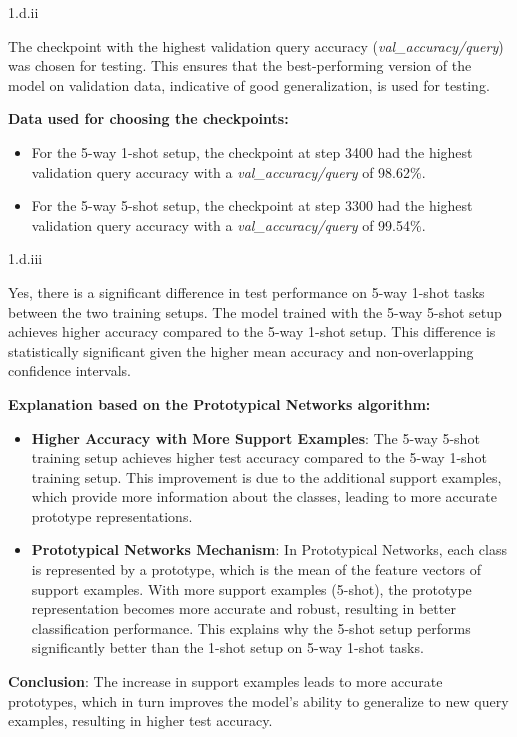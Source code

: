 \LARGE
1.d.ii
\normalsize

\begin{answer}
    The checkpoint with the highest validation query accuracy (\textit{val\_accuracy/query}) was chosen for testing. This ensures that the best-performing version of the model on validation data, indicative of good generalization, is used for testing.

\textbf{Data used for choosing the checkpoints:}

\begin{itemize}
    \item For the 5-way 1-shot setup, the checkpoint at step 3400 had the highest validation query accuracy with a \textit{val\_accuracy/query} of 98.62\%.
    \item For the 5-way 5-shot setup, the checkpoint at step 3300 had the highest validation query accuracy with a \textit{val\_accuracy/query} of 99.54\%.
\end{itemize}

\end{answer}

\LARGE
1.d.iii
\normalsize

\begin{answer}
    Yes, there is a significant difference in test performance on 5-way 1-shot tasks between the two training setups. The model trained with the 5-way 5-shot setup achieves higher accuracy compared to the 5-way 1-shot setup. This difference is statistically significant given the higher mean accuracy and non-overlapping confidence intervals.

\textbf{Explanation based on the Prototypical Networks algorithm:}

\begin{itemize}
    \item \textbf{Higher Accuracy with More Support Examples}: The 5-way 5-shot training setup achieves higher test accuracy compared to the 5-way 1-shot training setup. This improvement is due to the additional support examples, which provide more information about the classes, leading to more accurate prototype representations.
    \item \textbf{Prototypical Networks Mechanism}: In Prototypical Networks, each class is represented by a prototype, which is the mean of the feature vectors of support examples. With more support examples (5-shot), the prototype representation becomes more accurate and robust, resulting in better classification performance. This explains why the 5-shot setup performs significantly better than the 1-shot setup on 5-way 1-shot tasks.
\end{itemize}

\textbf{Conclusion}: The increase in support examples leads to more accurate prototypes, which in turn improves the model's ability to generalize to new query examples, resulting in higher test accuracy.

\end{answer}
        
